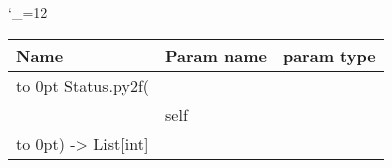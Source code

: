 \begingroup \catcode`\_=12 \tt
\begin{tabular}{lll}
\toprule
\textrm{Name}&\textrm{Param name}&\textrm{param type}\\
\midrule
\hbox to 0pt {Status.py2f(\hss}\\
& self\\
\hbox to 0pt{) -> List[int]\hss}\\
\bottomrule
\end{tabular}
\endgroup
